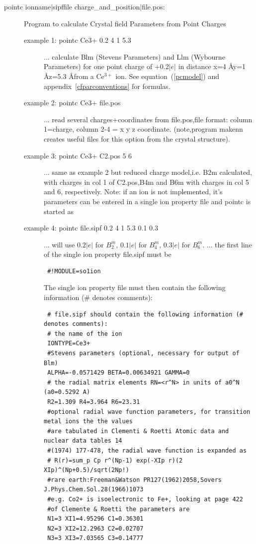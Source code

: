 \begin{description}
\item [\prg pointc {ionname$|$sipffile charge\_and\_position$|$file.pos}:]
Program to calculate Crystal field Parameters from Point Charges 
\begin{description}
\item [example 1: pointc  Ce3+ 0.2 4 1 5.3]
 ... calculate Blm (Stevens Parameters) and Llm (Wybourne Parameters) for one point 
    charge of +0.2$|e|$ in distance
                 x=4 \AA y=1 \AA z=5.3 \AA from a Ce$^{3+}$ ion. See equation~(\ref{pcmodel}) and
appendix~\ref{cfparconventions} for formulas.
\item [example 2: pointc Ce3+ file.pos]
 ... read several charges+coordinates from file.pos,file format:
      column 1=charge, column 2-4 = x y z coordinate. (note,program {\prg makenn}
      creates useful files for this option from the crystal structure).
\item [example 3: pointc Ce3+ C2.pos 5 6]
 ... same as example 2 but reduced charge model,i.e. B2m calculated, with
     charges in col 1 of C2.pos,B4m and B6m with charges in col 5 and 6, respectively.
Note: if an ion is not implemented, it's parameters can be 
                      entered in a single ion property file and {\prg pointc} is
                      started as 
\item [example 4: pointc file.sipf 0.2 4 1 5.3 0.1 0.3]
... will use $0.2|e|$ for $B_2^m$, $0.1|e|$ for $B_4^m$, $0.3|e|$ for $B_6^m$.
 ... the first line of the single ion property file.sipf must be
\begin{verbatim}
 #!MODULE=so1ion
\end{verbatim}
The single ion property file must then contain the following
                      information (\# denotes comments):
\begin{verbatim}
 # file.sipf should contain the following information (# denotes comments):
 # the name of the ion
 IONTYPE=Ce3+
 #Stevens parameters (optional, necessary for output of Blm)
 ALPHA=-0.0571429 BETA=0.00634921 GAMMA=0
 # the radial matrix elements RN=<r^N> in units of a0^N (a0=0.5292 A)
 R2=1.309 R4=3.964 R6=23.31
 #optional radial wave function parameters, for transition metal ions the the values
 #are tabulated in Clementi & Roetti Atomic data and nuclear data tables 14 
 #(1974) 177-478, the radial wave function is expanded as
 # R(r)=sum_p Cp r^(Np-1) exp(-XIp r)(2 XIp)^(Np+0.5)/sqrt(2Np!)
 #rare earth:Freeman&Watson PR127(1962)2058,Sovers J.Phys.Chem.Sol.28(1966)1073
 #e.g. Co2+ is isoelectronic to Fe+, looking at page 422
 #of Clemente & Roetti the parameters are 
 N1=3 XI1=4.95296 C1=0.36301 
 N2=3 XI2=12.2963 C2=0.02707 
 N3=3 XI3=7.03565 C3=0.14777
\end{verbatim}
\end{description}


\end{description}
